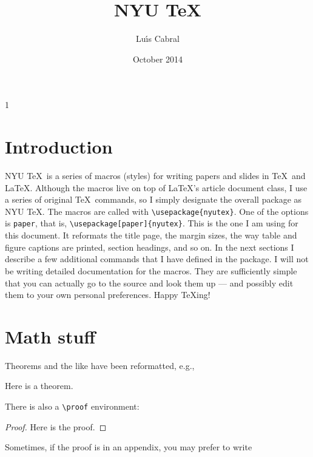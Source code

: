 \documentclass{article}
\begin{document}
\title{NYU \TeX}
\author{Lu\'{\i}s Cabral}
\date{October 2014}
\maketitle
\thispagestyle{empty}\setcounter{page}1



\oneline\oneline

\section{Introduction}

NYU \TeX\ is a series of macros (styles) for writing papers and slides in \TeX\ and \LaTeX. Although the macros live on top of \LaTeX's article document class, I use a series of original \TeX\ commands, so I simply designate the overall package as NYU \TeX. The macros are called with \verb|\usepackage{nyutex}|. One of the options is \verb|paper|, that is, \verb|\usepackage[paper]{nyutex}|. This is the one I am using for this document. It reformats the title page, the margin sizes, the way table and figure captions are printed, section headings, and so on. In the next sections I describe a few additional commands that I have defined in the package. I will not be writing detailed documentation for the macros. They are sufficiently simple that you can actually go to the source and look them up --- and possibly edit them to your own personal preferences. Happy \TeX ing!

\section{Math stuff}

Theorems and the like have been reformatted, e.g.,

\begin{theorem}
\label{th:main}
Here is a theorem.
\end{theorem}
%
There is also a \verb|\proof| environment:
\oneline

\begin{proof}Here is the proof.\end{proof}

\noindent
Sometimes, if the proof is in an appendix, you may prefer to write
\oneline
\end{document}
